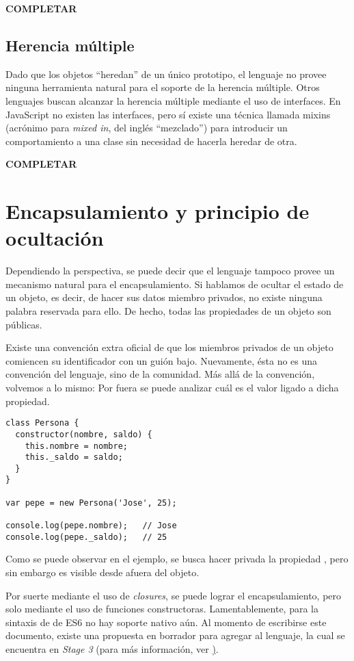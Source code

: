 \textbf{COMPLETAR}

\subsection{Herencia múltiple}

Dado que los objetos "`heredan"' de un único prototipo, el lenguaje no provee ninguna herramienta natural para el soporte de la herencia múltiple. Otros lenguajes buscan alcanzar la herencia múltiple mediante el uso de interfaces. En JavaScript no existen las interfaces, pero sí existe una técnica llamada mixins (acrónimo para \textit{mixed in}, del inglés "`mezclado"') para introducir un comportamiento a una clase sin necesidad de hacerla heredar de otra.

\textbf{COMPLETAR}

\section{Encapsulamiento y principio de ocultación}

Dependiendo la perspectiva, se puede decir que el lenguaje tampoco provee un mecanismo natural para el encapsulamiento. Si hablamos de ocultar el estado de un objeto, es decir, de hacer sus datos miembro privados, no existe ninguna palabra reservada para ello. De hecho, todas las propiedades de un objeto son públicas.

Existe una convención extra oficial de que los miembros privados de un objeto comiencen su identificador con un guión bajo. Nuevamente, ésta no es una convención del lenguaje, sino de la comunidad. Más allá de la convención, volvemos a lo mismo: Por fuera se puede analizar cuál es el valor ligado a dicha propiedad.

\begin{lstlisting}[title={Descubriendo variables "`privadas"'}]
class Persona {
  constructor(nombre, saldo) {
    this.nombre = nombre;
    this._saldo = saldo;
  }
}

var pepe = new Persona('Jose', 25);

console.log(pepe.nombre);	// Jose
console.log(pepe._saldo);	// 25
\end{lstlisting}

Como se puede observar en el ejemplo, se busca hacer privada la propiedad , pero sin embargo es visible desde afuera del objeto.

Por suerte mediante el uso de \textit{closures}, se puede lograr el encapsulamiento, pero solo mediante el uso de funciones constructoras. Lamentablemente, para la sintaxis de  de ES6 no hay soporte nativo aún. Al momento de escribirse este documento, existe una propuesta en borrador para agregar al lenguaje, la cual se encuentra en \textit{Stage 3} (para más información, ver \href{https://github.com/tc39/proposal-class-fields#private-fields}).

